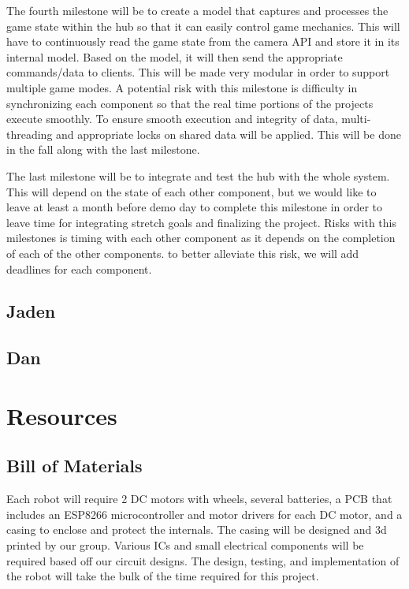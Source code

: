 \documentclass[11pt]{ieeeconf}
\begin{document}
The fourth milestone will be to create a model that captures and processes the game state within the hub so that it can easily control game mechanics. This will have to continuously read the game state from the camera API and store it in its internal model. Based on the model, it will then send the appropriate commands/data to clients. This will be made very modular in order to support multiple game modes. A potential risk with this milestone is difficulty in synchronizing each component so that the real time portions of the projects execute smoothly. To ensure smooth execution and integrity of data, multi-threading and appropriate locks on shared data will be applied. This will be done in the fall along with the last milestone.

The last milestone will be to integrate and test the hub with the whole system. This will depend on the state of each other component, but we would like to leave at least a month before demo day to complete this milestone in order to leave time for integrating stretch goals and finalizing the project. Risks with this milestones is timing with each other component as it depends on the completion of each of the other components. to better alleviate this risk, we will add deadlines for each component.  

\subsection{Jaden}

\subsection{Dan}

\section{Resources}
\subsection{Bill of Materials}

Each robot will require 2 DC motors with wheels, several batteries, a PCB that includes an ESP8266 microcontroller and motor drivers for each DC motor, and a casing to enclose and protect the internals. The casing will be designed and 3d printed by our group. Various ICs and small electrical components will be required based off our circuit designs. The design, testing, and implementation of the robot will take the bulk of the time required for this project.
\end{document}
